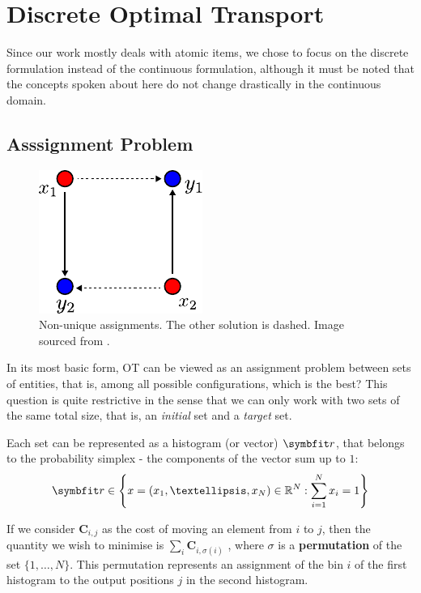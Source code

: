 \section{Discrete Optimal Transport}\label{sec:discrete-ot}

Since our work mostly deals with atomic items, we chose to focus on the discrete formulation instead of the continuous formulation, although it must be noted that the concepts spoken about here do not change drastically in the continuous domain.

\subsection{Asssignment Problem}\label{ssec:ot-assignment-prob}
\begin{figure}[ht]
    \centering
    \includegraphics{chapters/assets/ot/monge1.pdf}
    \caption{Non-unique assignments. The other solution is dashed. Image sourced from \parencite{peyre2019computational}.}
    \label{fig:ot-non-uniq}
\end{figure}
In its most basic form, OT can be viewed as an assignment problem between sets of entities, that is, among all possible configurations, which is the best? This question is quite restrictive in the sense that we can only work with two sets of the same total size, that is, an \textit{initial} set and a \textit{target} set.

Each set can be represented as a histogram (or vector) $\bfitr$, that belongs to the probability simplex - the components of the vector sum up to $1$:
\begin{equation}
    \bfitr \in \left\{ x = (x_1, …, x_N) \in \mathbb{R}^N : \sum_{i=1}^N x_i = 1 \right\} 
    \label{eqn:r-simplex-defn}
\end{equation}

If we consider $\symbf{C}_{i,j}$ as the cost of moving an element from $i$ to $j$, then the quantity we wish to minimise is $\sum_{i} \symbf{C}_{i,\sigma(i)}$ , where $\sigma$ is a \textbf{permutation} of the set $\{1,\ldots, N\}$. This permutation represents an assignment of the bin $i$ of the first histogram to the output positions $j$ in the second histogram.

